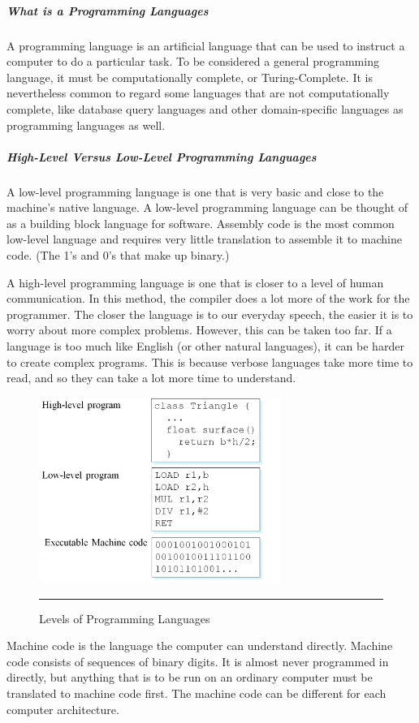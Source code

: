 \subparagraph*{What is a Programming Languages}
\hfill \break
A programming language is an artificial language that can be used to instruct a computer to do a particular task. To be considered a general programming language, it must be computationally complete, or Turing-Complete. It is nevertheless common to regard some languages that are not computationally complete, like database query languages and other domain-specific languages as programming languages as well.

\subparagraph*{High-Level Versus Low-Level Programming Languages}
\hfill \break
A low-level programming language is one that is very basic and close to the machine's native language. A low-level programming language can be thought of as a building block language for software. Assembly code is the most common low-level language and requires very little translation to assemble it to machine code. (The 1's and 0's that make up binary.)

A high-level programming language is one that is closer to a level of human communication. In this method, the compiler does a lot more of the work for the programmer. The closer the language is to our everyday speech, the easier it is to worry about more complex problems. However, this can be taken too far. If a language is too much like English (or other natural languages), it can be harder to create complex programs. This is because verbose languages take more time to read, and so they can take a lot more time to understand.
\begin{figure}[h!]
        \centering
                \includegraphics[width=0.7\textwidth]{./Pictures/lavels.jpg}
                  \rule{0.7\textwidth}{1pt}
        \caption{Levels of Programming Languages}
\end{figure}

Machine code is the language the computer can understand directly. Machine code consists of sequences of binary digits. It is almost never programmed in directly, but anything that is to be run on an ordinary computer must be translated to machine code first. The machine code can be different for each computer architecture.

